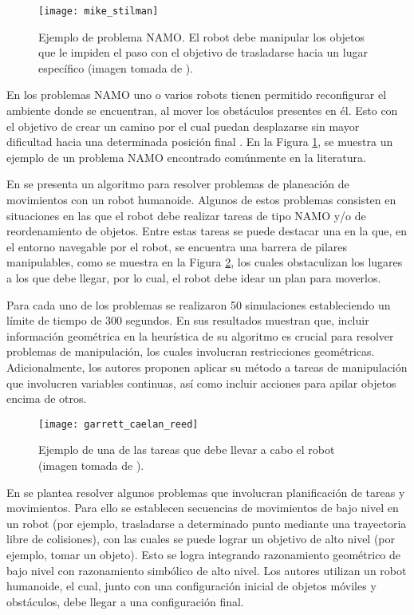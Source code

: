 %
%
%
%
%
\begin{figure}[H]
	\texttt{[image: mike\_stilman]}%
	\caption{Ejemplo de problema NAMO. El robot debe manipular los objetos que le impiden el paso con el objetivo de trasladarse hacia un lugar específico (imagen tomada de \cite{doi:10.1142/S0219843605000545}).}%
	\label{fig:S0219843605000545}%
\end{figure}
%
En los problemas NAMO uno o varios robots tienen permitido reconfigurar el ambiente donde se encuentran, al mover los obstáculos presentes en él.
Esto con el objetivo de crear un camino por el cual puedan desplazarse sin mayor dificultad hacia una determinada posición final \cite{doi:10.1142/S0219843605000545}.
En la Figura \ref{fig:S0219843605000545}, se muestra un ejemplo de un problema NAMO encontrado comúnmente en la literatura.

En \cite{doi:10.1177/0278364917739114} se presenta un algoritmo para resolver problemas de planeación de movimientos con un robot humanoide.
Algunos de estos problemas consisten en situaciones en las que el robot debe realizar tareas de tipo NAMO y/o de reordenamiento de objetos.
Entre estas tareas se puede destacar una en la que, en el entorno navegable por el robot, se encuentra una barrera de pilares manipulables, como se muestra en la Figura \ref{fig:0278364917739114}, los cuales obstaculizan los lugares a los que debe llegar, por lo cual, el robot debe idear un plan para moverlos.

Para cada uno de los problemas se realizaron 50 simulaciones estableciendo un límite de tiempo de 300 segundos.
En sus resultados muestran que, incluir información geométrica en la heurística de su algoritmo es crucial para resolver problemas de manipulación, los cuales involucran restricciones geométricas.
Adicionalmente, los autores proponen aplicar su método a tareas de manipulación que involucren variables continuas, así como incluir acciones para apilar objetos encima de otros.
%
\begin{figure}[H]
	\texttt{[image: garrett\_caelan\_reed]}%
	\caption{Ejemplo de una de las tareas que debe llevar a cabo el robot (imagen tomada de \cite{doi:10.1177/0278364917739114}).}%
	\label{fig:0278364917739114}%
\end{figure}
%
En \cite{Kim_Kaelbling_Lozano-Pérez_2019} se plantea resolver algunos problemas que involucran planificación de tareas y movimientos.
Para ello se establecen secuencias de movimientos de bajo nivel en un robot (por ejemplo, trasladarse a determinado punto mediante una trayectoria libre de colisiones), con las cuales se puede lograr un objetivo de alto nivel (por ejemplo, tomar un objeto).
Esto se logra integrando razonamiento geométrico de bajo nivel con razonamiento simbólico de alto nivel.
Los autores utilizan un robot humanoide, el cual, junto con una configuración inicial de objetos móviles y obstáculos, debe llegar a una configuración final.

